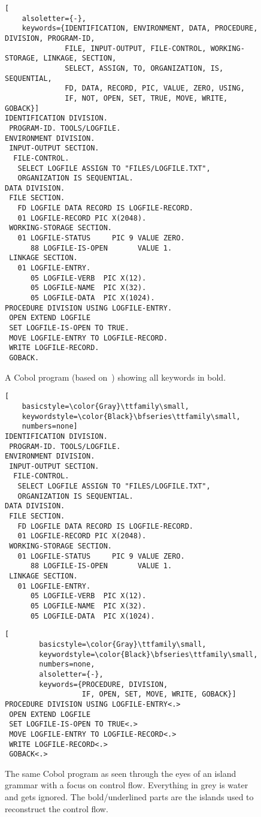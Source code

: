 \documentclass[a4paper]{article}
\begin{document}
\begin{figure}
\centering
\begin{lstlisting}[
    alsoletter={-},
    keywords={IDENTIFICATION, ENVIRONMENT, DATA, PROCEDURE, DIVISION, PROGRAM-ID,
              FILE, INPUT-OUTPUT, FILE-CONTROL, WORKING-STORAGE, LINKAGE, SECTION,
              SELECT, ASSIGN, TO, ORGANIZATION, IS, SEQUENTIAL,
              FD, DATA, RECORD, PIC, VALUE, ZERO, USING,
              IF, NOT, OPEN, SET, TRUE, MOVE, WRITE, GOBACK}]
IDENTIFICATION DIVISION.
 PROGRAM-ID. TOOLS/LOGFILE.
ENVIRONMENT DIVISION.
 INPUT-OUTPUT SECTION.
  FILE-CONTROL.
   SELECT LOGFILE ASSIGN TO "FILES/LOGFILE.TXT",
   ORGANIZATION IS SEQUENTIAL.
DATA DIVISION.
 FILE SECTION.
   FD LOGFILE DATA RECORD IS LOGFILE-RECORD.
   01 LOGFILE-RECORD PIC X(2048).
 WORKING-STORAGE SECTION.
   01 LOGFILE-STATUS     PIC 9 VALUE ZERO.
      88 LOGFILE-IS-OPEN       VALUE 1.
 LINKAGE SECTION.
   01 LOGFILE-ENTRY.
      05 LOGFILE-VERB  PIC X(12).
      05 LOGFILE-NAME  PIC X(32).
      05 LOGFILE-DATA  PIC X(1024).
PROCEDURE DIVISION USING LOGFILE-ENTRY.
 OPEN EXTEND LOGFILE
 SET LOGFILE-IS-OPEN TO TRUE.
 MOVE LOGFILE-ENTRY TO LOGFILE-RECORD.
 WRITE LOGFILE-RECORD.
 GOBACK.
\end{lstlisting}
\vspace{-5mm}
\caption{A Cobol program (based on~\cite{conf/aosd/LammelS05}) showing all keywords in bold.}
\label{fig:all-keywords-view}
\end{figure}

\begin{figure}
\centering
\begin{lstlisting}[
    basicstyle=\color{Gray}\ttfamily\small,
    keywordstyle=\color{Black}\bfseries\ttfamily\small,
    numbers=none]
IDENTIFICATION DIVISION.
 PROGRAM-ID. TOOLS/LOGFILE.
ENVIRONMENT DIVISION.
 INPUT-OUTPUT SECTION.
  FILE-CONTROL.
   SELECT LOGFILE ASSIGN TO "FILES/LOGFILE.TXT",
   ORGANIZATION IS SEQUENTIAL.
DATA DIVISION.
 FILE SECTION.
   FD LOGFILE DATA RECORD IS LOGFILE-RECORD.
   01 LOGFILE-RECORD PIC X(2048).
 WORKING-STORAGE SECTION.
   01 LOGFILE-STATUS     PIC 9 VALUE ZERO.
      88 LOGFILE-IS-OPEN       VALUE 1.
 LINKAGE SECTION.
   01 LOGFILE-ENTRY.
      05 LOGFILE-VERB  PIC X(12).
      05 LOGFILE-NAME  PIC X(32).
      05 LOGFILE-DATA  PIC X(1024).
\end{lstlisting}
\vspace{-4mm}
\begin{lstlisting}[
        basicstyle=\color{Gray}\ttfamily\small,
        keywordstyle=\color{Black}\bfseries\ttfamily\small,
        numbers=none,
        alsoletter={-},
        keywords={PROCEDURE, DIVISION, 
                  IF, OPEN, SET, MOVE, WRITE, GOBACK}]
PROCEDURE DIVISION USING LOGFILE-ENTRY<.>
 OPEN EXTEND LOGFILE
 SET LOGFILE-IS-OPEN TO TRUE<.>
 MOVE LOGFILE-ENTRY TO LOGFILE-RECORD<.>
 WRITE LOGFILE-RECORD<.>
 GOBACK<.>
\end{lstlisting}
\vspace{-5mm}
\caption{The same Cobol program as seen through the eyes of an island grammar with a focus on control flow. Everything in grey is water and gets ignored. The bold/underlined parts are the islands used to reconstruct the control flow.}
\label{fig:island-view}
\end{figure}
\end{document}
